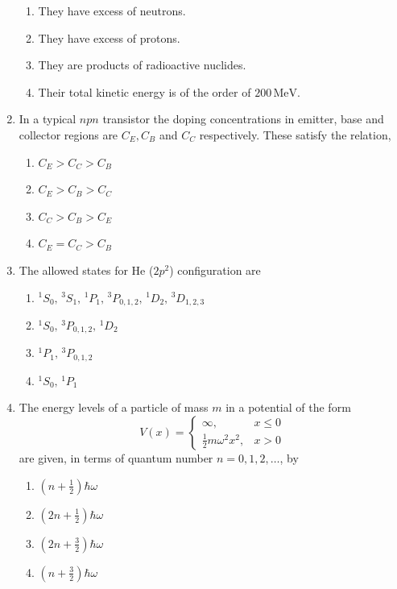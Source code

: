 \documentclass[journal,13pt,onecolumn]{IEEEtran}
\begin{document}
\begin{enumerate}[itemsep = 1em]
\hfill{}

\begin{enumerate}
    \item They have excess of neutrons.
    \item They have excess of protons.
    \item They are products of radioactive nuclides.
    \item Their total kinetic energy is of the order of $200\,\mathrm{MeV}$.
\end{enumerate}


\item In a typical $npn$ transistor the doping concentrations in emitter, base and collector regions are $C_E, C_B$ and $C_C$ respectively. These satisfy the relation,

\hfill{}

\begin{enumerate}
    \item $C_E > C_C > C_B$
    \item $C_E > C_B > C_C$
    \item $C_C > C_B > C_E$
    \item $C_E = C_C > C_B$
\end{enumerate}


\item The allowed states for He ($2p^2$) configuration are

\hfill{}

\begin{enumerate}
    \item $^1S_0,\, ^3S_1,\, ^1P_1,\, ^3P_{0,1,2},\, ^1D_2,\, ^3D_{1,2,3}$
    \item $^1S_0,\, ^3P_{0,1,2},\, ^1D_2$
    \item $^1P_1,\, ^3P_{0,1,2}$
    \item $^1S_0,\, ^1P_1$
\end{enumerate}


\item The energy levels of a particle of mass $m$ in a potential of the form
\[
V(x) = 
\begin{cases}
\infty, & x \leq 0 \\
\frac{1}{2}m\omega^2 x^2, & x > 0
\end{cases}
\]
are given, in terms of quantum number $n = 0,1,2,\dots$, by

\hfill{}

\begin{enumerate}
    \item $\left(n + \frac{1}{2}\right)\hbar\omega$
    \item $\left(2n + \frac{1}{2}\right)\hbar\omega$
    \item $\left(2n + \frac{3}{2}\right)\hbar\omega$
    \item $\left(n + \frac{3}{2}\right)\hbar\omega$
\end{enumerate}



\end{enumerate}
\end{document}
